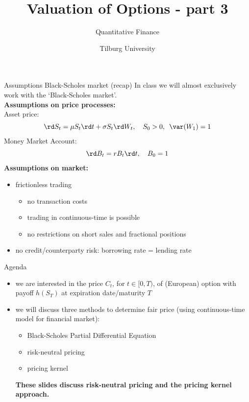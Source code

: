 \documentclass[pdf, handout]{beamer}
\title{Valuation of Options - part 3}
\subtitle{Quantitative Finance}
\author{Tilburg University}
\institute{Ramon van den Akker}
\date{}
\begin{document}
\begin{frame}
\titlepage
\end{frame}

\begin{frame}{Assumptions  Black-Scholes market (recap)}
In class we will almost exclusively work with the `Black-Scholes market'.
\\ \vspace{.5cm}
\textbf{Assumptions on price processes:} \\
Asset price:
\[
\rd S_t=\mu S_t \rd t + \sigma S_t \rd W_t,\quad S_0>0,\,\,\, \var(W_1) = 1
\]
Money Market Account:
\[
\rd B_t= r B_t \rd t,\quad B_0=1
\]
\textbf{Assumptions on market:} \\
\begin{itemize}
\item frictionless trading
\begin{itemize}
\item no transaction costs
\item trading in continuous-time is possible
\item no restrictions on short sales and fractional positions
\end{itemize}
\item no credit/counterparty risk: borrowing rate = lending rate
\end{itemize}
\end{frame}

\begin{frame}{Agenda}
\begin{itemize}
\item we are interested in the price $C_t$, for $t\in [0,T)$, of (European) option with payoff $h(S_T)$ at expiration date/maturity $T$
\item we will discuss three methods to determine fair price (using continuous-time model for financial market):
\begin{itemize}
\item Black-Scholes Partial Differential Equation
\item risk-neutral pricing
\item pricing kernel
\end{itemize}
\textbf{These slides discuss risk-neutral pricing and the pricing kernel approach.}
\end{itemize}
\end{frame}
\end{document}
